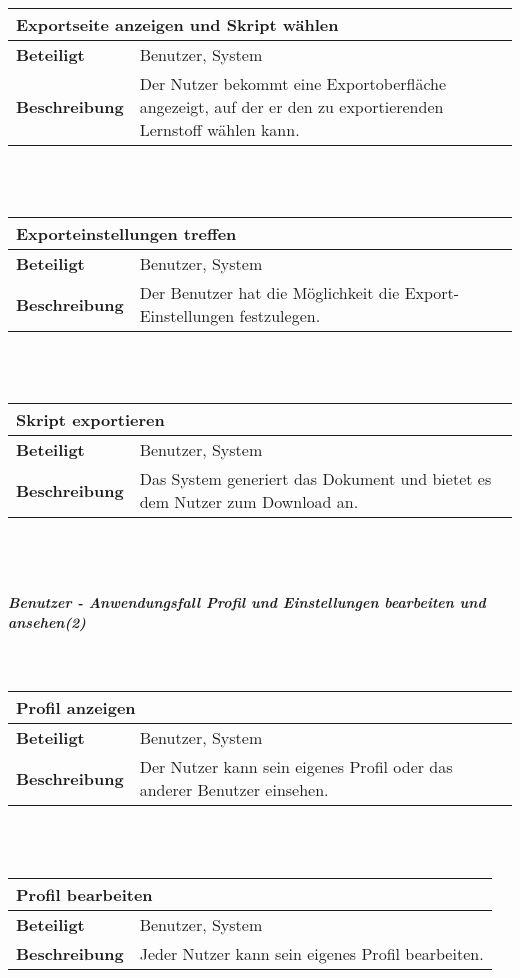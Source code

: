 \documentclass[12pt,a4paper]{article}
\begin{document}
\begin{tabular}{l p{10cm}}
\multicolumn{2}{l}{\textbf{Exportseite anzeigen und Skript wählen}} \\ \hline
\textbf{Beteiligt} & Benutzer, System \\ \hline 
\textbf{Beschreibung} & Der Nutzer bekommt eine Exportoberfläche angezeigt, auf der er den zu exportierenden Lernstoff wählen kann.\\ 
\hline 
\end{tabular}\\\\

\begin{tabular}{l p{10cm}}
\multicolumn{2}{l}{\textbf{Exporteinstellungen treffen}} \\ \hline
\textbf{Beteiligt} & Benutzer, System \\ \hline 
\textbf{Beschreibung} & Der Benutzer hat die Möglichkeit die Export-Einstellungen festzulegen.\\ 
\hline 
\end{tabular}\\\\

\begin{tabular}{l p{10cm}}
\multicolumn{2}{l}{\textbf{Skript exportieren}} \\ \hline
\textbf{Beteiligt} & Benutzer, System \\ \hline 
\textbf{Beschreibung} & Das System generiert das Dokument und bietet es dem Nutzer zum Download an.\\ 
\hline 
\end{tabular}\\\\
\subparagraph{Benutzer - Anwendungsfall \glqq Profil und Einstellungen bearbeiten und ansehen\grqq  (2)}\mbox{}\\

\begin{tabular}{l p{10cm}}
\multicolumn{2}{l}{\textbf{Profil anzeigen}} \\ \hline
\textbf{Beteiligt} & Benutzer, System \\ \hline 
\textbf{Beschreibung} & Der Nutzer kann sein eigenes Profil oder das anderer Benutzer einsehen.\\ 
\hline 
\end{tabular}\\\\

\begin{tabular}{l p{10cm}}
\multicolumn{2}{l}{\textbf{Profil bearbeiten}} \\ \hline
\textbf{Beteiligt} & Benutzer, System \\ \hline 
\textbf{Beschreibung} & Jeder Nutzer kann sein eigenes Profil bearbeiten.\\ 
\hline 
\end{tabular}\\\\
\end{document}
